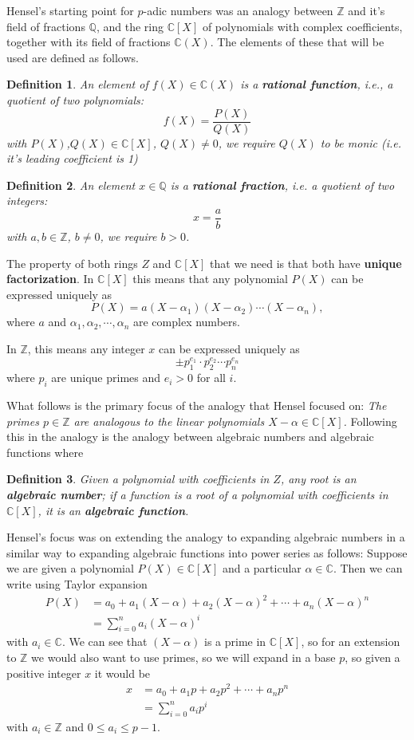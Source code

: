 \documentclass[11pt]{article}
\newtheorem{definition}{Definition}[section]
\newcommand{\Z}{\mathbb{Z}}
\newcommand{\C}{\mathbb{C}}
\newcommand{\Q}{\mathbb{Q}}
\newcommand{\padic}{$p$-adic }
\begin{document}
Hensel's starting point for \padic numbers was an analogy between $\Z$ and it's field of fractions $\Q$, and the ring $\C[X]$ of polynomials with complex coefficients, together with its field of fractions $\C(X)$. The elements of these that will be used are defined as follows.
\begin{definition}
  An element of $f(X) \in \C(X)$ is a \textbf{rational function}, i.e., a quotient of two polynomials:
  \[
    f(X)= \frac{P(X)}{Q(X)}
  \]
  with $P(X)$,$ Q(X) \in \C[X]$, $Q(X) \neq 0$, we require $Q(X)$ to be monic (i.e. it's leading coefficient is 1)
\end{definition}
\begin{definition}
  An element $x\in \Q$ is a \textbf{rational fraction}, i.e. a quotient of two integers:
  \[
    x=\frac{a}{b}
  \]
  with $a,b\in \Z$, $b \neq 0$, we require $b>0$.
\end{definition}
The property of both rings $Z$ and $\C[X]$ that we need is that both have \textbf{unique factorization}.
In $\C[X]$ this means that any polynomial $P(X)$ can be expressed uniquely as
\[
  P (X) = a(X - \alpha_1)(X - \alpha_2)\cdots (X - \alpha_n),
\]
where $a$ and $\alpha_1,\alpha_2, \cdots, \alpha_n$ are complex numbers.

In $\Z$, this means any integer $x$ can be expressed uniquely as
\[
  \pm p_1^{e_1} \cdot p_2^{e_2} \cdots p_n^{e_n}
\]
where $p_i$ are unique primes and $e_i>0$ for all $i$.

What follows is the primary focus of the analogy that Hensel focused on: \textit{The primes $p \in \Z$ are analogous to the linear polynomials $X - \alpha \in \C[X]$.} Following this in the analogy is the analogy between algebraic numbers and algebraic functions where
\begin{definition}
  Given a polynomial with coefficients in $Z$, any root is an \textbf{algebraic number}; if a function is a root of a polynomial with coefficients in $\C[X]$, it is an \textbf{algebraic function}.
\end{definition}
Hensel's focus was on extending the analogy to expanding algebraic numbers in a similar way to expanding algebraic functions into power series as follows:
Suppose we are given a polynomial $P(X) \in \C[X]$ and a particular $\alpha \in \C$. Then we can write using Taylor expansion
\begin{align*}
  P(X) & = a_0 +a_1(X-\alpha)+a_2(X-\alpha)^2 +\cdots+a_n(X-\alpha)^n \\
       & = \sum_{i=0}^n a_i(X-\alpha)^i
\end{align*}
with $a_i\in \C$.
We can see that $(X-\alpha)$ is a prime in $\C[X]$, so for an extension to $\Z$ we would also want to use primes, so we will expand in a base $p$, so given a positive integer $x$ it would be
\begin{align*}
  x & = a_0 +a_1p+a_2p^2 +\cdots+a_np^n \\
    & = \sum_{i=0}^n a_ip^i
\end{align*}
with $a_i \in\Z$ and $0\leq a_i \leq p-1$.
\end{document}
